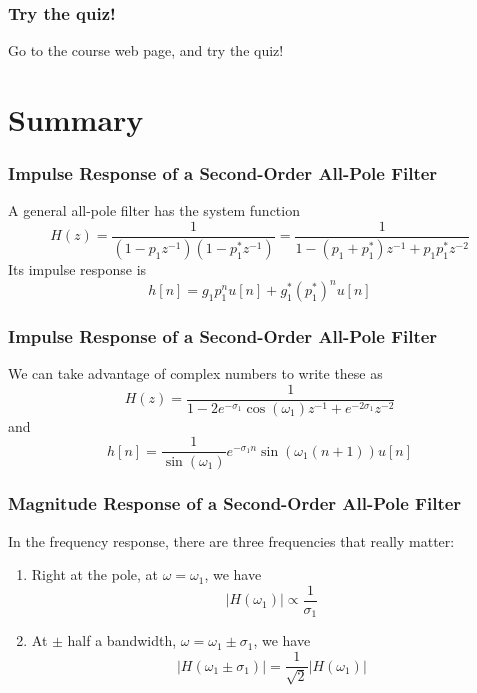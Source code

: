 \documentclass{beamer}
\begin{document}
\begin{frame}
  \frametitle{Try the quiz!}

  Go to the course web page, and try the quiz!
\end{frame}

\section[Summary]{Summary}
\setcounter{subsection}{1}

\begin{frame}
  \frametitle{Impulse Response of a Second-Order All-Pole Filter}

  A general all-pole filter has the system function
  \[
  H(z) = \frac{1}{(1-p_1z^{-1})(1-p_1^*z^{-1})}= \frac{1}{1-(p_1+p_1^*)z^{-1}+p_1p_1^*z^{-2}}
  \]
  Its impulse response is 
  \[
  h[n] = g_1p_1^n u[n] + g_1^* (p_1^*)^n u[n]
  \]
\end{frame}

\begin{frame}
  \frametitle{Impulse Response of a Second-Order All-Pole Filter}

  We can take advantage of complex numbers to write these as
  \[
  H(z) = \frac{1}{1-2e^{-\sigma_1}\cos(\omega_1)z^{-1}+ e^{-2\sigma_1}z^{-2}}
  \]
  and
  \[
  h[n] = \frac{1}{\sin(\omega_1)} e^{-\sigma_1n}\sin(\omega_1(n+1)) u[n]
  \]
\end{frame}

\begin{frame}
  \frametitle{Magnitude Response of a Second-Order All-Pole Filter}

  In the frequency response, there are three frequencies that really matter:
  \begin{enumerate}
  \item Right at the pole, at $\omega=\omega_1$, we have
    \begin{displaymath}
      |H(\omega_1)| \propto \frac{1}{\sigma_1}
    \end{displaymath}
  \item At $\pm$ half a bandwidth, $\omega=\omega_1\pm\sigma_1$, we have
    \begin{displaymath}
      |H(\omega_1\pm\sigma_1)| =\frac{1}{\sqrt{2}}|H(\omega_1)|
    \end{displaymath}
  \end{enumerate}
\end{frame}  
\end{document}
